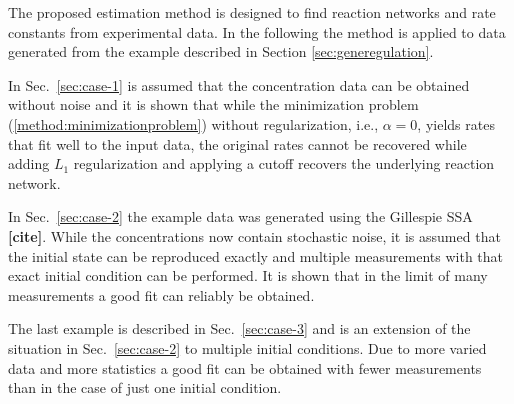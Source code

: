 \documentclass[oneside, abstracton, titlepage]{scrartcl}
\begin{document}
	The proposed estimation method is designed to find reaction networks and rate constants from experimental data. In the following the method is applied to data generated from the example described in Section \ref{sec:generegulation}.

	In Sec.~\ref{sec:case-1} is assumed that the concentration data can be obtained without noise and it is shown that while the minimization problem (\ref{method:minimizationproblem}) without regularization, i.e., $\alpha=0$, yields rates that fit well to the input data, the original rates cannot be recovered while adding $L_1$ regularization and applying a cutoff recovers the underlying reaction network.
	
	In Sec.~\ref{sec:case-2} the example data was generated using the Gillespie SSA \textbf{[cite]}. While the concentrations now contain stochastic noise, it is assumed that the initial state can be reproduced exactly and multiple measurements with that exact initial condition can be performed. It is shown that in the limit of many measurements a good fit can reliably be obtained.
	
	The last example is described in Sec.~\ref{sec:case-3} and is an extension of the situation in Sec.~\ref{sec:case-2} to multiple initial conditions. Due to more varied data and more statistics a good fit can be obtained with fewer measurements than in the case of just one initial condition.
	
\end{document}
